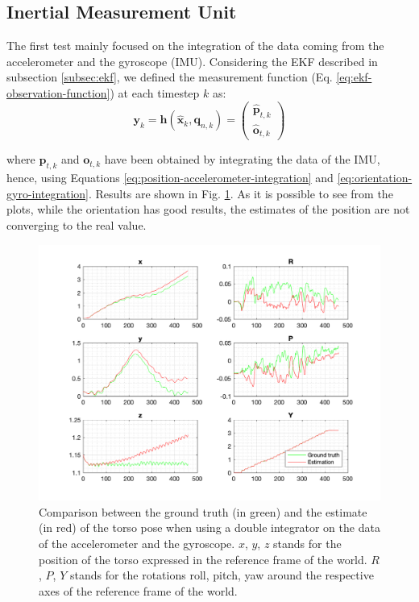 \documentclass[a4paper]{article}
\begin{document}
\subsection{Inertial Measurement Unit}
The first test mainly focused on the integration of the data coming from
the accelerometer and the gyroscope (IMU). Considering the EKF described in
subsection \ref{subsec:ekf}, we defined the measurement function (Eq.
\ref{eq:ekf-observation-function}) at each timestep $k$ as:
\begin{equation}
    \bm{y}_k = \bm{h}(\bm{\hat{x}}_k, \bm{q}_{n, k}) =
        \begin{pmatrix}
            \bm{\hat{p}}_{t, k} \\
            \bm{\hat{o}}_{t, k}
        \end{pmatrix}
\end{equation}

\noindent where $\bm{p}_{t, k}$ and $\bm{o}_{t, k}$ have been obtained by
integrating the data of the IMU, hence, using Equations \ref{eq:position-accelerometer-integration}
and \ref{eq:orientation-gyro-integration}. Results are shown in Fig.
\ref{fig:comp_ground_truth_estimated_torso_accelerometer}. As it is possible
to see from the plots, while the orientation has good results, the estimates of
the position are not converging to the real value.
\begin{figure}
    \centering
    \includegraphics[width=\textwidth]{images/accelerometer.png}
    \caption{Comparison between the ground truth (in green) and the estimate (in red) of the torso
        pose when using a double integrator on the data of the accelerometer
        and the gyroscope. $x$, $y$, $z$ stands for the position
        of the torso expressed in the reference frame of the
        world. $R$, $P$, $Y$ stands for the rotations roll,
        pitch, yaw around the respective axes of the
        reference frame of the world.}
    \label{fig:comp_ground_truth_estimated_torso_accelerometer}
\end{figure}
\end{document}
